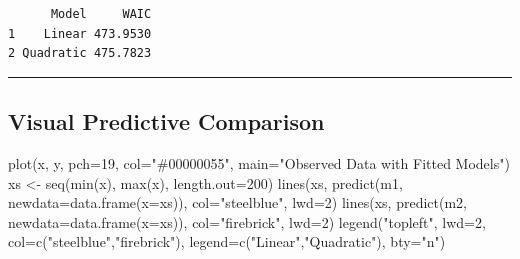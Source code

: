 \documentclass[
  letterpaper,
  DIV=11,
  numbers=noendperiod]{scrreprt}
\newenvironment{Shaded}{\begin{snugshade}}{\end{snugshade}}
\newcommand{\AttributeTok}[1]{\textcolor[rgb]{0.40,0.45,0.13}{#1}}
\newcommand{\DecValTok}[1]{\textcolor[rgb]{0.68,0.00,0.00}{#1}}
\newcommand{\FunctionTok}[1]{\textcolor[rgb]{0.28,0.35,0.67}{#1}}
\newcommand{\NormalTok}[1]{\textcolor[rgb]{0.00,0.23,0.31}{#1}}
\newcommand{\OtherTok}[1]{\textcolor[rgb]{0.00,0.23,0.31}{#1}}
\newcommand{\StringTok}[1]{\textcolor[rgb]{0.13,0.47,0.30}{#1}}
\begin{document}
\begin{verbatim}
      Model     WAIC
1    Linear 473.9530
2 Quadratic 475.7823
\end{verbatim}

\begin{center}\rule{0.5\linewidth}{0.5pt}\end{center}

\subsection{Visual Predictive
Comparison}\label{visual-predictive-comparison}

\begin{Shaded}
\begin{Highlighting}[]
\FunctionTok{plot}\NormalTok{(x, y, }\AttributeTok{pch=}\DecValTok{19}\NormalTok{, }\AttributeTok{col=}\StringTok{"\#00000055"}\NormalTok{, }\AttributeTok{main=}\StringTok{"Observed Data with Fitted Models"}\NormalTok{)}
\NormalTok{xs }\OtherTok{\textless{}{-}} \FunctionTok{seq}\NormalTok{(}\FunctionTok{min}\NormalTok{(x), }\FunctionTok{max}\NormalTok{(x), }\AttributeTok{length.out=}\DecValTok{200}\NormalTok{)}
\FunctionTok{lines}\NormalTok{(xs, }\FunctionTok{predict}\NormalTok{(m1, }\AttributeTok{newdata=}\FunctionTok{data.frame}\NormalTok{(}\AttributeTok{x=}\NormalTok{xs)), }\AttributeTok{col=}\StringTok{"steelblue"}\NormalTok{, }\AttributeTok{lwd=}\DecValTok{2}\NormalTok{)}
\FunctionTok{lines}\NormalTok{(xs, }\FunctionTok{predict}\NormalTok{(m2, }\AttributeTok{newdata=}\FunctionTok{data.frame}\NormalTok{(}\AttributeTok{x=}\NormalTok{xs)), }\AttributeTok{col=}\StringTok{"firebrick"}\NormalTok{, }\AttributeTok{lwd=}\DecValTok{2}\NormalTok{)}
\FunctionTok{legend}\NormalTok{(}\StringTok{"topleft"}\NormalTok{, }\AttributeTok{lwd=}\DecValTok{2}\NormalTok{, }\AttributeTok{col=}\FunctionTok{c}\NormalTok{(}\StringTok{"steelblue"}\NormalTok{,}\StringTok{"firebrick"}\NormalTok{),}
       \AttributeTok{legend=}\FunctionTok{c}\NormalTok{(}\StringTok{"Linear"}\NormalTok{,}\StringTok{"Quadratic"}\NormalTok{), }\AttributeTok{bty=}\StringTok{"n"}\NormalTok{)}
\end{Highlighting}
\end{Shaded}
\end{document}
